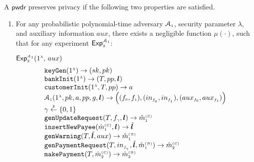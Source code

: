 


\begin{definition}[Privacy]\label{def::privacy} A $\mathsf{pwdr}$ preserves privacy if  the following two properties are satisfied.
\begin{enumerate}

\item For any probabilistic polynomial-time  adversary $\mathcal{A}_{\scriptscriptstyle 1}$,  security parameter $\lambda$, and  auxiliary information $aux$, there exists a negligible function $\mu(\cdot)$, such that for any  experiment $\mathsf{Exp}_{\scriptscriptstyle 3}^{\mathcal{A}_{\scriptscriptstyle 1}}$:


\begin{center}
{\small{
\begin{mybox}[colback=white,  width=77.5mm, height=60mm, left=-2mm, drop fuzzy shadow southwest]{$\mathsf{Exp}_{\st 3}^{\st\mathcal{A}_{\st 1}}(1^{\st\lambda}\text{, }  {aux})$}
$$
  \begin{array}{l}
%
 \mathtt{keyGen}(1^{\st\lambda})\rightarrow (sk,pk)\\
%
  \mathtt{bankInit}(1^{\st \lambda})\rightarrow (T, pp, \bm{l})\\
%
\mathtt{customerInit} (1^{\st \lambda}, T, pp)\rightarrow a\\
%
\mathcal{A}_{\st 1}(1^{\st \lambda}, pk, a, pp, g, \bm{l})\rightarrow \Big((f_{\st 0}, f_{\st 1}),(in_{\st f_{\st_{\st 0}}},in_{\st f_{\st _1}}),({aux}_{\st f_{0}},{aux}_{\st f_{\st1}})\Big)\\
%
\gamma\stackrel{\st \$}\leftarrow\{0,1\}\\
%
\mathtt{genUpdateRequest}(T, f_{\st \gamma}, {\bm l})\rightarrow \hat m^{\st\mathcal{(C)}}_{\st 1}\\
%
\mathtt{insertNewPayee}(\hat{m}^{\st\mathcal{(C)}}_{\st 1}, {\bm l})\rightarrow  \hat{\bm l}\\
%
\mathtt{genWarning}(T, \hat{\bm l}, {aux})\rightarrow \hat m^{\st\mathcal{(B)}}_{\st1}\\
%
\mathtt{genPaymentRequest}(T, in_{\st f_{_\gamma}}, \hat{\bm{l}}, \hat m^{\st\mathcal{(B)}}_{\st1})\rightarrow \hat m^{\st\mathcal{(C)}}_{\st2}\\
%
\mathtt{makePayment}(T, \hat m^{\st\mathcal{(C)}}_{\st2})\rightarrow \hat m^{\st\mathcal{(B)}}_{\st2}\\

\end{array}$$
\end{mybox}}}
\end{center}
\end{enumerate}
\end{definition}
